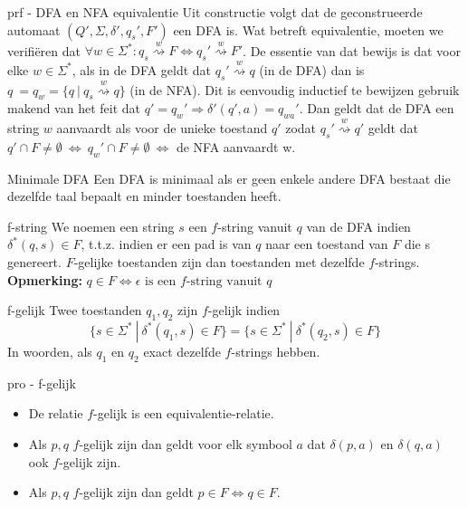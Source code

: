 \begin{prf}{prf - DFA en NFA equivalentie}
    Uit constructie volgt dat de geconstrueerde automaat \((Q', \Sigma, \delta', q_s', F')\) een DFA is.
    Wat betreft equivalentie, moeten we verifiëren dat \(\forall w \in \Sigma^*:  q_s \overset{w}{\rightsquigarrow} F \Leftrightarrow q_s' \overset{w}{\rightsquigarrow} F'\). 
    De essentie van dat bewijs is dat voor elke \(w \in \Sigma^*\), als in de DFA geldt dat \(q_s' \overset{w}{\rightsquigarrow} q\) (in de DFA) dan is \(q\ = q_w = \{ q \ | \ q_s \overset{w}{\rightsquigarrow} q \}\) (in de NFA).
    Dit is eenvoudig inductief te bewijzen gebruik makend van het feit dat \(q' = q_w' \Rightarrow \delta'(q',a) = q_{wa}'\). Dan geldt dat de 
    DFA een string $w$ aanvaardt als voor de unieke toestand \(q'\) zodat \(q_s' \overset{w}{\rightsquigarrow} q'\) geldt dat \(q' \cap F \neq \emptyset \ \Leftrightarrow \ q_w' \cap F \neq \emptyset \ \Leftrightarrow\) de NFA aanvaardt w.
\end{prf}

\begin{theo}{Minimale DFA}
    Een DFA is minimaal als er geen enkele andere DFA bestaat die dezelfde taal bepaalt en minder toestanden heeft.
\end{theo}

\begin{theo}[$f$-string]{f-string}
    We noemen een string $s$ een $f$-string vanuit $q$ van de DFA indien \(\delta^*(q,s) \in F\), t$.$t$.$z$.$ indien er een pad is van $q$ naar een toestand van $F$ die s genereert. $F$-gelijke toestanden
    zijn dan toestanden met dezelfde $f$-strings. \vspace{0.3cm}\\
    \textbf{Opmerking:} \(q \in F \Leftrightarrow \epsilon \text{ is een $f$-string vanuit $q$}\)
\end{theo}

\begin{theo}[$f$-gelijk]{f-gelijk}
    Twee toestanden \(q_1,q_2\) zijn $f$-gelijk indien
    \begin{equation*}
        \{ s \in \Sigma^* \ | \ \delta^*(q_1,s) \in F\} = \{s \in \Sigma^* \ | \ \delta^*(q_2,s) \in F\}
    \end{equation*}
    In woorden, als $q_1$ en $q_2$ exact dezelfde $f$-strings hebben.
\end{theo}

\begin{pro}[$f$-gelijk]{pro - f-gelijk}
    \begin{itemize}
        \item De relatie $f$-gelijk is een equivalentie-relatie.
        \item Als $p,q$ $f$-gelijk zijn dan geldt voor elk symbool $a$ dat \(\delta(p,a)\) en \(\delta(q,a)\) ook $f$-gelijk zijn.
        \item Als $p,q$ $f$-gelijk zijn dan geldt \(p \in F \Leftrightarrow q \in F\).
    \end{itemize}
\end{pro}

